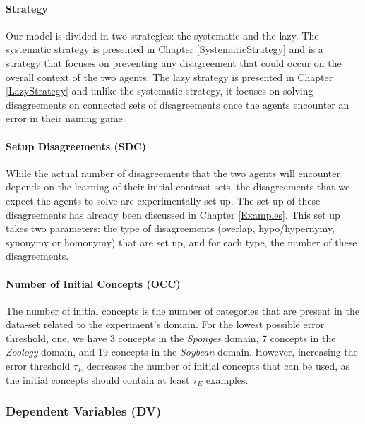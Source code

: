 \paragraph{Strategy}
Our model is divided in two strategies: the systematic and the lazy.
The systematic strategy is presented in Chapter \ref{SystematicStrategy} and is a strategy that focuses on preventing any disagreement that could occur on the overall context of the two agents.
The lazy strategy is presented in Chapter \ref{LazyStrategy} and unlike the systematic strategy, it focuses on solving disagreements on connected sets of disagreements once the agents encounter an error in their naming game.

\paragraph{Setup Disagreements (SDC)}
While the actual number of disagreements that the two agents will encounter depends on the learning of their initial contrast sets, the disagreements that we expect the agents to solve are experimentally set up. The set up of these disagreements has already been discussed in Chapter \ref{Examples}. This set up takes two parameters: the type of disagreements (overlap, hypo/hypernymy, synonymy or homonymy) that are set up, and for each type, the number of these disagreements.

\paragraph{Number of Initial Concepts (OCC)}
The number of initial concepts is the number of categories that are present in the data-set related to the experiment's domain. For the lowest possible error threshold, one, we have 3 concepts in the \emph{Sponges} domain, 7 concepts in the \emph{Zoology} domain, and 19 concepts in the \emph{Soybean} domain. However, increasing the error threshold $\tau_{E}$ decreases the number of initial concepts that can be used, as the initial concepts should contain at least $\tau_{E}$ examples.

\subsubsection{Dependent Variables (DV)}

